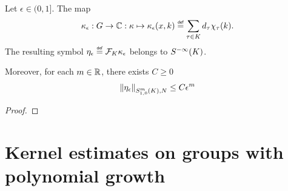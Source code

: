 \begin{lemma}
    Let $\epsilon \in (0, 1]$.
    The map
    \begin{align*}
        \kappa_\epsilon : \Group \to \C :
        \kappa \mapsto \kappa_\epsilon(x, k)
        \defeq \sum_{\tau \in \CompactGroup}
        \dimRep \tau \Character \tau(k).
    \end{align*}
    The resulting symbol $\eta_\epsilon \defeq \Fourier [\CompactGroup] \kappa_\epsilon$ belongs to $\SmoothingSymbols [\CompactGroup]$.

    Moreover,
    for each $m \in \R$,
    there exists $C \geq 0$
    \begin{align*}
        \SymbolSemiNorm [\CompactGroup] m {1, 0} N {\eta_\epsilon}
        \leq C \epsilon^m
    \end{align*}
\end{lemma}
\begin{proof}
\end{proof}

\section{Kernel estimates on groups with polynomial growth}

